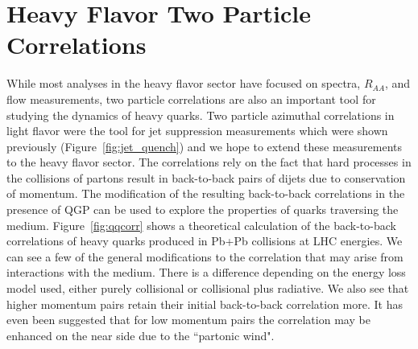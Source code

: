 \section{Heavy Flavor Two Particle Correlations}

While most analyses in the heavy flavor sector have focused on spectra, $R_{AA}$, and flow measurements, two particle correlations are also an important tool for studying the dynamics of heavy quarks. Two particle azimuthal correlations in light flavor were the tool for jet suppression measurements which were shown previously (Figure~\ref{fig:jet_quench}) and we hope to extend these measurements to the heavy flavor sector. The correlations rely on the fact that hard processes in the collisions of partons result in back-to-back pairs of dijets due to conservation of momentum. The modification of the resulting back-to-back correlations in the presence of QGP can be used to explore the properties of quarks traversing the medium. Figure~\ref{fig:qqcorr} shows a theoretical calculation of the back-to-back correlations of heavy quarks produced in Pb+Pb collisions at LHC energies. We can see a few of the general modifications to the correlation that may arise from interactions with the medium. There is a difference depending on the energy loss model used, either purely collisional or collisional plus radiative. We also see that higher momentum pairs retain their initial back-to-back correlation more. It has even been suggested that for low momentum pairs the correlation may be enhanced on the near side due to the ``partonic wind".

